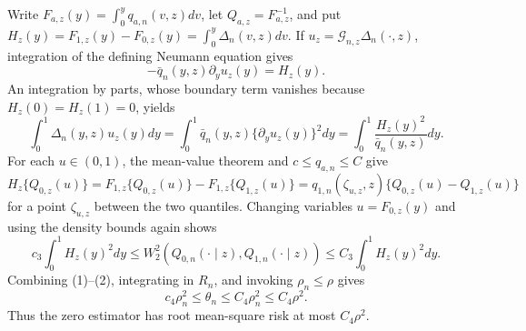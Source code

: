 Write \(F_{a,z}(y)=\int_0^yq_{a,n}(v,z)dv\), let \(Q_{a,z}=F_{a,z}^{-1}\), and put \(H_z(y)=F_{1,z}(y)-F_{0,z}(y)=\int_0^y\Delta_n(v,z)dv\).  If \(u_z=\mathcal G_{n,z}\Delta_n(\cdot,z)\), integration of the defining Neumann equation gives
\[
 -\bar q_n(y,z)\partial_yu_z(y)=H_z(y).
\]
An integration by parts, whose boundary term vanishes because \(H_z(0)=H_z(1)=0\), yields
\[
 \int_0^1\Delta_n(y,z)u_z(y)dy
 =\int_0^1\bar q_n(y,z)\{\partial_yu_z(y)\}^2dy
 =\int_0^1\frac{H_z(y)^2}{\bar q_n(y,z)}dy. \tag{1}
\]
For each \(u\in(0,1)\), the mean-value theorem and \(c\le q_{a,n}\le C\) give
\[
 H_z\{Q_{0,z}(u)\}
 =F_{1,z}\{Q_{0,z}(u)\}-F_{1,z}\{Q_{1,z}(u)\}
 =q_{1,n}(\zeta_{u,z},z)\{Q_{0,z}(u)-Q_{1,z}(u)\}
\]
for a point \(\zeta_{u,z}\) between the two quantiles.  Changing variables \(u=F_{0,z}(y)\) and using the density bounds again shows
\[
 c_3\int_0^1H_z(y)^2dy
 \le W_2^2(Q_{0,n}(\cdot\mid z),Q_{1,n}(\cdot\mid z))
 \le C_3\int_0^1H_z(y)^2dy. \tag{2}
\]
Combining (1)--(2), integrating in \(R_n\), and invoking \(\rho_n\le\rho\) gives
\[
 c_4\rho_n^2\le\theta_n\le C_4\rho_n^2\le C_4\rho^2. \tag{3}
\]
Thus the zero estimator has root mean-square risk at most \(C_4\rho^2\).

